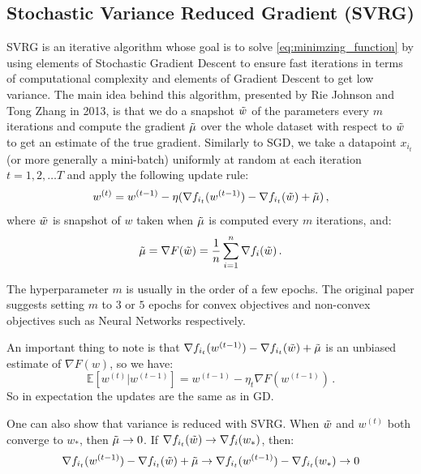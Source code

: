 \documentclass[a4paper,11pt,oneside]{report}
\begin{document}
\subsection{Stochastic Variance Reduced Gradient (SVRG)}
SVRG is an iterative algorithm whose goal is to solve \autoref{eq:minimzing_function} by using elements of Stochastic Gradient Descent to ensure fast iterations in terms of computational complexity and elements of Gradient Descent to get low variance. The main idea behind this algorithm, presented by Rie Johnson and Tong Zhang in 2013, is that we do a snapshot $\Tilde{w}$ of the parameters every $m$ iterations and compute the gradient $\Tilde{\mu}$ over the whole dataset with respect to $\Tilde{w}$ to get an estimate of the true gradient. Similarly to SGD, we take a datapoint $x_{i_t}$(or more generally a mini-batch) uniformly at random at each iteration $t=1,2,\dots T$ and apply the following update rule:
\begin{equation}\label{eq:updateSVRG}
    w^{(t)} = w^{(t-1)} -\eta(\nabla f_{i_t}(w^{(t-1)}) - \nabla f_{i_t}(\Tilde{w}) + \Tilde{\mu})\,,
\end{equation}
where $\Tilde{w}$ is snapshot of $w$ taken when $\Tilde{\mu}$ is computed every $m$ iterations, and:
\begin{equation}\label{eq:snapshotGradientSVRG}
    \Tilde{\mu} = \nabla F(\Tilde{w}) = \frac{1}{n}\sum_{i=1}^n \nabla f_i(\Tilde{w})\,.
\end{equation}

The hyperparameter $m$ is usually in the order of a few epochs. The original paper suggests setting $m$ to $3$ or $5$ epochs for convex objectives and non-convex objectives such as Neural Networks respectively. 

An important thing to note is that $\nabla f_{i_t}(w^{(t-1)}) - \nabla f_{i_t}(\Tilde{w}) + \Tilde{\mu}$ is an unbiased estimate of $\nabla F(w)$, so we have:
\begin{equation}
    \mathbb{E}[w^{(t)} | w^{(t-1)}] = w^{(t-1)}-\eta_t \nabla F(w^{(t-1)})\,.
\end{equation}
So in expectation the updates are the same as in GD. 

One can also show that variance is reduced with SVRG. When $\Tilde{w}$ and $w^{(t)}$ both converge to $w_{\ast}$, then $\Tilde{\mu} \rightarrow 0$. If $\nabla f_{i_t}(\Tilde{w}) \rightarrow \nabla f_i(w_{\ast})$, then:
\begin{equation}
    \nabla f_{i_t}(w^{(t-1)}) - \nabla f_{i_t}(\Tilde{w}) + \Tilde{\mu} \rightarrow \nabla f_{i_t}(w^{(t-1)}) - \nabla f_{i_t}(w_{\ast}) \rightarrow 0
\end{equation}
        
\end{document}
